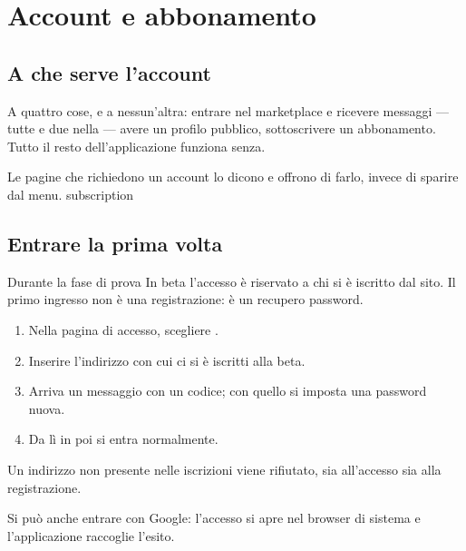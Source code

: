 \chapter{Account e abbonamento}\label{cap:account}

\section{A che serve l'account}\label{sez:account-serve2}

A quattro cose, e a nessun'altra: entrare nel marketplace e ricevere
messaggi --- tutte e due nella  --- avere un profilo
pubblico, sottoscrivere un abbonamento. Tutto il resto dell'applicazione
funziona senza.

  {Le pagine che richiedono un account lo dicono e offrono di farlo, invece
   di sparire dal menu.}
  {subscription}

\section{Entrare la prima volta}\label{sez:entrare}

\begin{pratica}{Durante la fase di prova}
In beta l'accesso è riservato a chi si è iscritto dal sito. Il primo
ingresso non è una registrazione: è un recupero password.

\begin{enumerate}
  \item Nella pagina di accesso, scegliere .
  \item Inserire l'indirizzo con cui ci si è iscritti alla beta.
  \item Arriva un messaggio con un codice; con quello si imposta una
        password nuova.
  \item Da lì in poi si entra normalmente.
\end{enumerate}

Un indirizzo non presente nelle iscrizioni viene rifiutato, sia
all'accesso sia alla registrazione.
\end{pratica}

\noindent
Si può anche entrare con Google: l'accesso si apre nel browser di sistema e
l'applicazione raccoglie l'esito.

